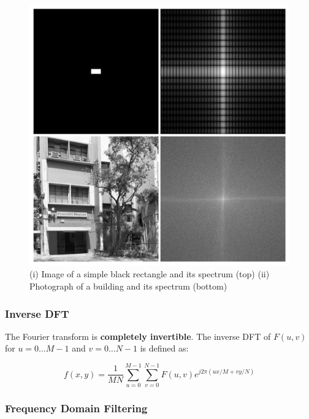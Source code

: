 \begin{figure}[H]
  \centering
  \includegraphics[width=\linewidth]{images/dft_spectra.png}
  \caption{(i) Image of a simple black rectangle and its spectrum
  (top) (ii) Photograph of a building and its spectrum (bottom)}
\end{figure}

\subsubsection*{Inverse DFT}

The Fourier transform is \textbf{completely invertible}. The inverse
DFT of $F(u, v)$ for $u = 0 \ldots M-1$ and $v = 0 \ldots N-1$ is defined as:

\begin{equation*}
  f(x, y) = \frac{1}{MN} \sum_{u=0}^{M-1} \sum_{v=0}^{N-1} F(u, v)
  e^{j2\pi\left(ux/M + vy/N\right)}
\end{equation*}

\subsubsection*{Frequency Domain Filtering}

